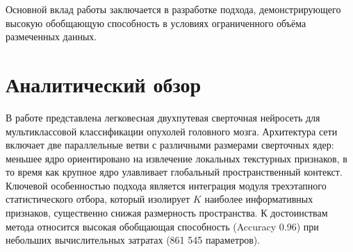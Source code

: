 \documentclass[eqsecnum, authorsinfo]{kioj6}
\begin{document}
Основной вклад работы заключается в разработке подхода, демонстрирующего высокую обобщающую способность в условиях ограниченного объёма размеченных данных.

\pagebreak
\section{Аналитический обзор}


В работе \cite{1} представлена легковесная двухпутевая сверточная нейросеть для мультиклассовой классификации опухолей головного мозга. 
Архитектура сети включает две параллельные ветви с различными размерами сверточных ядер: меньшее ядро ориентировано на извлечение локальных текстурных признаков, 
в то время как крупное ядро улавливает глобальный пространственный контекст. Ключевой особенностью подхода является интеграция модуля трехэтапного 
статистического отбора, который изолирует $K$ наиболее информативных признаков, существенно снижая размерность пространства. К достоинствам метода относится 
высокая обобщающая способность (Accuracy 0.96) при небольших вычислительных затратах (861 545 параметров).
\end{document}
